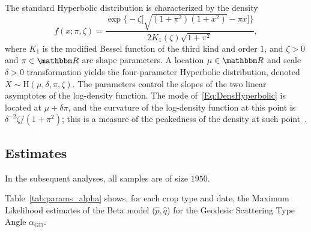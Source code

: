 \documentclass[journal]{IEEEtran}
\begin{document}
{The standard Hyperbolic distribution is characterized by the density
\begin{equation}
f(x;\pi,\zeta)=\frac{\exp\big\{-\zeta\big[\sqrt{(1+\pi^2)(1+x^2)} - \pi x \big]\big\}}{2 K_1(\zeta) \sqrt{1+\pi^2} }  
,\label{Eq:DensHyperbolic}
\end{equation}
where $K_1$ is the modified Bessel function of the third kind and order $1$, and $\zeta>0$ and $\pi\in\mathbbm R$ are shape parameters.
A location $\mu\in\mathbbm R$ and scale $\delta>0$  transformation yields the four-parameter Hyperbolic distribution, denoted $X\sim\text{H}(\mu,\delta,\pi,\zeta)$.
The parameters control the slopes of the two linear asymptotes of the log-density function.
The mode of~\eqref{Eq:DensHyperbolic} is located at $\mu+\delta\pi$, and the curvature of the log-density function at this point is $\delta^{-2}\zeta/(1+\pi^2)$;
this is a measure of the peakedness of the density at such point~\cite[vol~5, pp.~3278--3281]{EncyclopediaofStatisticalSciences}.


\subsection{Estimates}

In the subsequent analyses, all samples are of size $1950$. 

Table~\ref{tab:params_alpha} shows, for each crop type and date, 
the Maximum Likelihood estimates of the Beta model ($\widehat p,\widehat q$) for the Geodesic Scattering Type Angle $\alpha_{\text{GD}}$.

}
\end{document}
